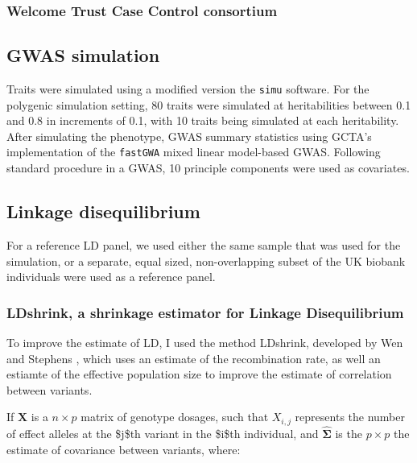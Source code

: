 \subsubsection{Welcome Trust Case Control consortium}\label{sec:orgec3f022}




\subsection{GWAS simulation}\label{sec:orgad711ec}

Traits were simulated using a modified version the \texttt{simu} software. For the polygenic simulation setting, 80 traits were simulated at heritabilities between 0.1 and 0.8 in increments of 0.1, with 10 traits
being simulated at each heritability.  After simulating the phenotype, GWAS summary statistics using GCTA's implementation of the \texttt{fastGWA} mixed linear model-based GWAS.  Following standard procedure in a GWAS,
10 principle components were used as covariates. 


\subsection{Linkage disequilibrium}\label{sec:org828aaeb}

For a reference LD panel, we used either the same sample that was used for the simulation, or a separate, equal sized, 
non-overlapping subset of the UK biobank individuals were used as a reference panel.  


\subsubsection{LDshrink, a shrinkage estimator for Linkage Disequilibrium}\label{sec:orgae044da}

To improve the estimate of LD, I used the method LDshrink, developed by Wen and Stephens \cite{Wen_2010}, which uses an estimate of 
the recombination rate, as well an estiamte of the effective population size to improve the estimate of correlation between variants.

If \(\boldsymbol{X}\) is a \(n \times p\) matrix of genotype dosages, such that \(X_{i,j}\) represents the number of effect alleles at the \$j\$th variant in the \$i\$th individual, and \(\hat{\boldsymbol{\Sigma}}\) is the \(p \times p\)  the estimate of covariance between
variants, where:

